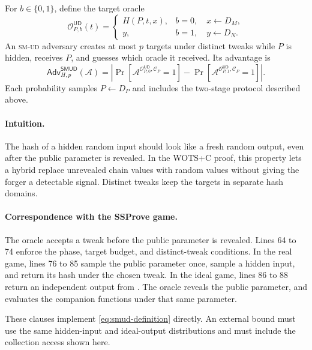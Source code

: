 \documentclass[11pt,a4paper]{article}
\theoremstyle{plain}
\theoremstyle{definition}
\DeclareRobustCommand{\coq}[1]{\texttt{\detokenize{#1}}}
\newcommand{\SSProve}{\textsf{SSProve}\xspace}
\newcommand{\WOTSC}{\textsf{WOTS+C}\xspace}
\newcommand{\Adv}{\mathsf{Adv}}
\newcommand{\A}{\mathcal{A}}
\newcommand{\smud}{\textsc{sm-ud}\xspace}
\begin{document}
For \(b\in\{0,1\}\), define the target oracle
\[
  \mathcal O^{\mathsf{UD}}_{P,b}(t)=
  \begin{cases}
    H(P,t,x), & b=0,\quad x\leftarrow D_M,\\
    y,        & b=1,\quad y\leftarrow D_N.
  \end{cases}
\]
An \smud adversary creates at most \(p\) targets under distinct tweaks while \(P\) is hidden, receives \(P\), and guesses which oracle it received.
Its advantage is
\begin{equation}
\label{eq:smud-definition}
  \Adv^{\mathsf{SMUD}}_{H,p}(\A)
  =
  \left|
    \Pr\!\left[\A^{\mathcal O^{\mathsf{UD}}_{P,0},\mathcal C_P}=1\right]
    -
    \Pr\!\left[\A^{\mathcal O^{\mathsf{UD}}_{P,1},\mathcal C_P}=1\right]
  \right|.
\end{equation}
Each probability samples \(P\leftarrow D_P\) and includes the two-stage protocol described above.

\paragraph{Intuition.}
The hash of a hidden random input should look like a fresh random output, even after the public parameter is revealed.
In the \WOTSC proof, this property lets a hybrid replace unrevealed chain values with random values without giving the forger a detectable signal.
Distinct tweaks keep the targets in separate hash domains.



\paragraph{Correspondence with the \SSProve game.}
The oracle \coq{UQUERY} accepts a tweak before the public parameter is revealed.
Lines 64 to 74 enforce the phase, target budget, and distinct-tweak conditions.
In the real game, lines 76 to 85 sample the public parameter once, sample a hidden input, and return its hash under the chosen tweak.
In the ideal game, lines 86 to 88 return an independent output from \coq{th_dN}.
The oracle \coq{UGETPP} reveals the public parameter, and \coq{UCOLLQ} evaluates the companion functions under that same parameter.

These clauses implement \eqref{eq:smud-definition} directly.
An external bound must use the same hidden-input and ideal-output distributions and must include the collection access shown here.
\end{document}
